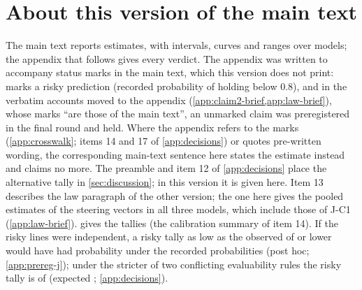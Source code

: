 \section*{About this version of the main text}
The main text reports estimates, with intervals, curves and ranges over models; the appendix that follows gives every verdict. The appendix was written to accompany status marks in the main text, which this version does not print: \rsk{} marks a risky prediction (recorded probability of holding below 0.8), and in the verbatim accounts moved to the appendix (\cref{app:claim2-brief,app:law-brief}), whose marks ``are those of the main text'', an unmarked claim was preregistered in the final round and held. Where the appendix refers to the marks (\cref{app:crosswalk}; items 14 and 17 of \cref{app:decisions}) or quotes pre-written wording, the corresponding main-text sentence here states the estimate instead and claims no more. The preamble and item 12 of \cref{app:decisions} place the alternative tally in \cref{sec:discussion}; in this version it is given here. Item 13 describes the law paragraph of the other version; the one here gives the pooled estimates of the steering vectors in all three models, which include those of J-C1 (\cref{app:law-brief}).  gives the tallies (the calibration summary of item 14). If the risky lines were independent, a risky tally as low as the observed \JxRiskyMetABCD{} of \JxRiskyVerdABCD{} or lower would have had probability \JxRiskyTailP{} under the recorded probabilities (post hoc; \cref{app:prereg-j}); under the stricter of two conflicting evaluability rules the risky tally is \JxRiskyMetABCDAlt{} of \JxRiskyVerdABCDAlt{} (expected \JxRiskyExpABCDAlt; \cref{app:decisions}).

